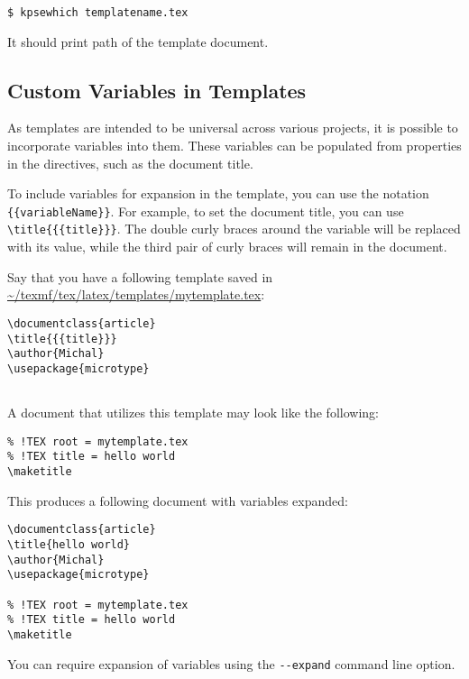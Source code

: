 \begin{verbatim}
$ kpsewhich templatename.tex
\end{verbatim}

It should print path of the template document.

\subsection{Custom Variables in Templates}\label{sec:variables}

As templates are intended to be universal across various projects, it is
possible to incorporate variables into them. These variables can be populated
from properties in the directives, such as the document title.

To include variables for expansion in the template, you can use the notation
\verb|{{variableName}}|. For example, to set the document title, you can use
\texttt{\textbackslash title\{\{\{title\}\}\}}. The double curly braces around
the variable will be replaced with its value, while the third pair of curly braces will remain in the
document.

Say that you have a following template saved in \url{~/texmf/tex/latex/templates/mytemplate.tex}:

\begin{verbatim}
\documentclass{article}
\title{{{title}}}
\author{Michal}
\usepackage{microtype}


\end{verbatim}


A document that utilizes this template may look like the following:

\begin{verbatim}
% !TEX root = mytemplate.tex
% !TEX title = hello world
\maketitle
\end{verbatim}


This produces a following document with variables expanded:

\begin{verbatim}
\documentclass{article}
\title{hello world}
\author{Michal}
\usepackage{microtype}

% !TEX root = mytemplate.tex
% !TEX title = hello world
\maketitle

\end{verbatim}

You can require expansion of variables using the \verb|--expand| command line option.

